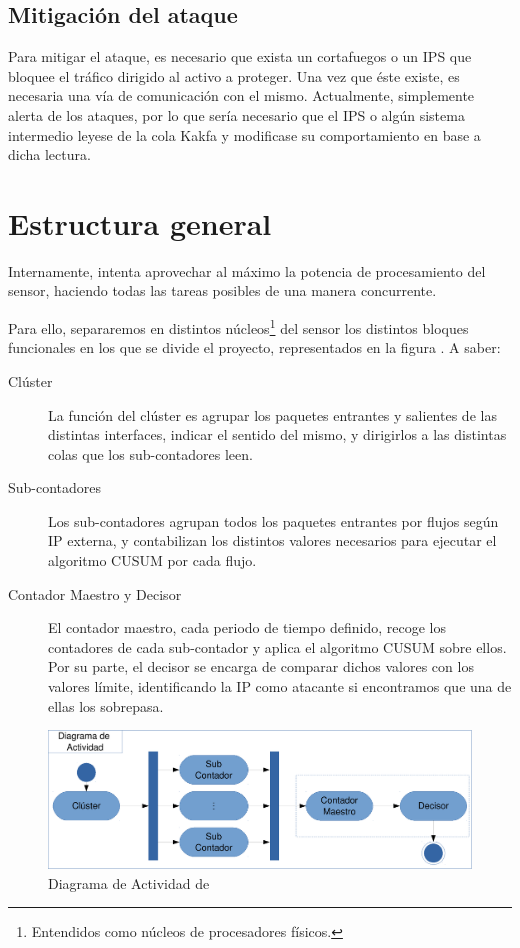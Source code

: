 \subsection{Mitigación del ataque}
Para mitigar el ataque, es necesario que exista un cortafuegos o un \gls{IPS} que bloquee el tráfico dirigido al activo a proteger. Una vez que éste existe, es necesaria una vía 
de comunicación con el mismo. Actualmente, \redborderddos{} simplemente alerta de los ataques, por lo que sería 
necesario que el \gls{IPS} o algún sistema intermedio leyese de la cola Kakfa y modificase su comportamiento en base a 
dicha lectura.

\section{Estructura general}
Internamente, \redborderddos{} intenta aprovechar al máximo la potencia de procesamiento del sensor, haciendo todas las 
tareas posibles de una manera concurrente.

Para ello, separaremos en distintos núcleos\footnote{Entendidos como núcleos de procesadores físicos.} del sensor los 
distintos bloques funcionales en los que se divide el proyecto, representados en la figura . A 
saber:

\begin{description}
 \item [Clúster] La función del clúster es agrupar los paquetes entrantes y salientes de las distintas 
interfaces, indicar el sentido del mismo, y dirigirlos a las distintas colas que los sub-contadores leen.
 \item [Sub-contadores] Los sub-contadores agrupan todos los paquetes entrantes por flujos según IP externa, y 
contabilizan los distintos valores necesarios para ejecutar el algoritmo \gls{CUSUM} por cada flujo.
 \item [Contador Maestro y Decisor] El contador maestro, cada periodo de tiempo definido, recoge los contadores de cada 
sub-contador y aplica el algoritmo \gls{CUSUM} sobre ellos. Por su parte, el decisor se encarga de comparar dichos 
valores con los valores límite, identificando la IP como atacante si encontramos que una de ellas los sobrepasa.
\end{description}

\begin{figure}[htbp]
\centering
\includegraphics[width=\textwidth]{CapituloEstructura/Figuras/DiagramaFlow-crop}
\caption{Diagrama de Actividad de \redborderddos}
\end{figure}
%

